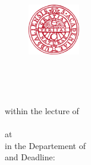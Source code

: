 
\begin{titlepage}


\begin{figure}
	\raggedright
	\includegraphics[width=0.2\textwidth]{./fig/uppsla_university.png}
\end{figure}


\begin{center}
	\vspace*{0pt}
	\begin{Huge}
		\textbf{\mytitle}\\
	\end{Huge}
	\vspace*{4em}
	\begin{LARGE}
		\textbf{\MakeUppercase{\mytypeofwork}}\\
	\end{LARGE}	
	\vspace*{2em}
	within the lecture of\\
	\mycourse\\
	\vspace*{2em}
	at \myuniversity\\
	in the Departement of \mydepartement\\
	\vspace*{2em}
	\myauthora{} and \myauthorb{}
	\vspace*{2em}
	Deadline: \myduedate\\
	\vspace*{3em}
	\vfill
	

\end{center}
\end{titlepage}
